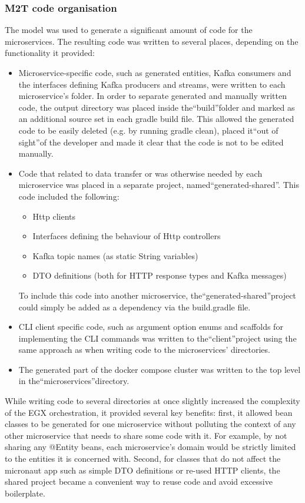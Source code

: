 \documentclass[parskip=full]{article}
\begin{document}
    \subsubsection{M2T code organisation}
    The model was used to generate a significant amount of code for the microservices.
    The resulting code was written to several places, depending on the functionality it provided:
    \begin{itemize}
\item	Microservice-specific code, such as generated entities, Kafka consumers and the interfaces defining Kafka producers and streams, were written to each microservice's folder.
In order to separate generated and manually written code, the output directory was placed inside the``build''folder and marked as an additional source set in each gradle build file.
This allowed the generated code to be easily deleted (e.g. by running gradle clean), placed it``out of sight''of the developer and made it clear that the code is not to be edited manually.
\item	Code that related to data transfer or was otherwise needed by each microservice was placed in a separate project, named``generated-shared''.
This code included the following:
\begin{itemize}
    \item	Http clients
    \item	Interfaces defining the behaviour of Http controllers
    \item	Kafka topic names (as static String variables)
    \item	DTO definitions (both for HTTP response types and Kafka messages)
\end{itemize}
To include this code into another microservice, the``generated-shared''project could simply be added as a dependency via the build.gradle file.
\item	CLI client specific code, such as argument option enums and scaffolds for implementing the CLI commands was written to the``client''project using the same approach as when writing code to the microservices' directories.
\item	The generated part of the docker compose cluster was written to the top level in the``microservices''directory.
\end{itemize}
While writing code to several directories at once slightly increased the complexity of the EGX orchestration, it provided several key benefits: first, it allowed bean classes to be generated for one microservice without polluting the context of any other microservice that needs to share some code with it.
For example, by not sharing any @Entity beans, each microservice's domain would be strictly limited to the entities it is concerned with.
Second, for classes that do not affect the micronaut app such as simple DTO definitions or re-used HTTP clients, the shared project became a convenient way to reuse code and avoid excessive boilerplate.
\end{document}
